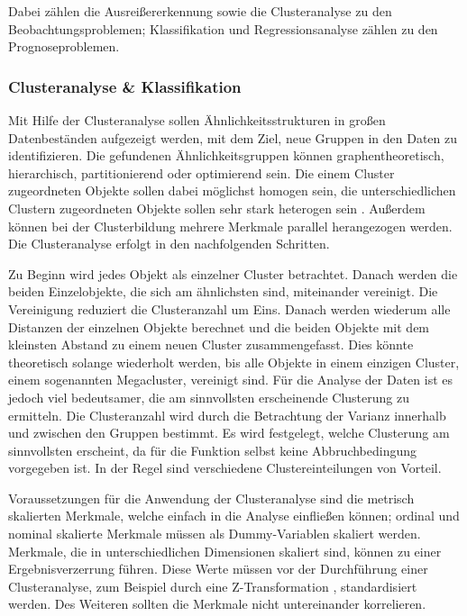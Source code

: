 \bigskip

Dabei zählen die Ausreißererkennung sowie die Clusteranalyse zu den Beobachtungsproblemen; Klassifikation und Regressionsanalyse zählen zu den Prognoseproblemen.

\subsubsection{Clusteranalyse \& Klassifikation}

Mit Hilfe der Clusteranalyse sollen Ähnlichkeitsstrukturen in großen Datenbeständen aufgezeigt werden, mit dem Ziel, neue Gruppen in den Daten zu identifizieren. Die gefundenen Ähnlichkeitsgruppen können graphentheoretisch, hierarchisch, partitionierend oder optimierend sein. Die einem Cluster zugeordneten Objekte sollen dabei möglichst homogen sein, die unterschiedlichen Clustern zugeordneten Objekte sollen sehr stark heterogen sein \cite{Janssen.2007}. Außerdem können bei der Clusterbildung mehrere Merkmale parallel herangezogen werden. Die Clusteranalyse erfolgt in den nachfolgenden Schritten.
	
Zu Beginn wird jedes Objekt als einzelner Cluster betrachtet. Danach werden die beiden Einzelobjekte, die sich am ähnlichsten sind, miteinander vereinigt. Die Vereinigung reduziert die Clusteranzahl um Eins. Danach werden wiederum alle Distanzen der einzelnen Objekte berechnet und die beiden Objekte mit dem kleinsten Abstand zu einem neuen Cluster zusammengefasst. Dies könnte theoretisch solange wiederholt werden, bis alle Objekte in einem einzigen Cluster, einem sogenannten Megacluster, vereinigt sind. Für die Analyse der Daten ist es jedoch viel bedeutsamer, die am sinnvollsten erscheinende Clusterung zu ermitteln. Die Clusteranzahl wird durch die Betrachtung der Varianz innerhalb und zwischen den Gruppen bestimmt. Es wird festgelegt, welche Clusterung am sinnvollsten erscheint, da für die Funktion selbst keine Abbruchbedingung vorgegeben ist. In der Regel sind verschiedene Clustereinteilungen von Vorteil.
	
Voraussetzungen für die Anwendung der Clusteranalyse sind die metrisch skalierten Merkmale, welche einfach in die Analyse einfließen können; ordinal und nominal skalierte Merkmale müssen als Dummy-Variablen \cite{Janssen.2007} skaliert werden. Merkmale, die in unterschiedlichen Dimensionen skaliert sind, können zu einer Ergebnisverzerrung führen. Diese Werte müssen vor der Durchführung einer Clusteranalyse, zum Beispiel durch eine Z-Transformation \cite{Janssen.2007}, standardisiert werden. Des Weiteren sollten die Merkmale nicht untereinander korrelieren.
	
